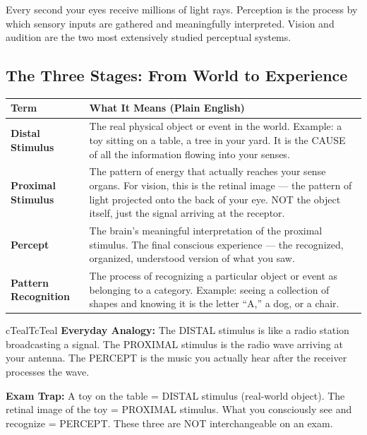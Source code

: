 \documentclass[11pt,a4paper]{article}
\newcommand{\bb}[1]{\textbf{#1}}
\begin{document}
Every second your eyes receive millions of light rays. Perception is the process by which sensory inputs are gathered and meaningfully interpreted. Vision and audition are the two most extensively studied perceptual systems.

\subsection*{The Three Stages: From World to Experience}

\begin{center}
\renewcommand{\arraystretch}{1.4}
\begin{tabular}{|L{3.2cm}|L{12cm}|}
\hline
{}\color{white}\bb{Term} & \color{white}\bb{What It Means (Plain English)} \\
\hline
\bb{Distal Stimulus} & The real physical object or event in the world. Example: a toy sitting on a table, a tree in your yard. It is the CAUSE of all the information flowing into your senses. \\
\bb{Proximal Stimulus} & The pattern of energy that actually reaches your sense organs. For vision, this is the retinal image --- the pattern of light projected onto the back of your eye. NOT the object itself, just the signal arriving at the receptor. \\
\bb{Percept} & The brain's meaningful interpretation of the proximal stimulus. The final conscious experience --- the recognized, organized, understood version of what you saw. \\
\bb{Pattern Recognition} & The process of recognizing a particular object or event as belonging to a category. Example: seeing a collection of shapes and knowing it is the letter ``A,'' a dog, or a chair. \\
\hline
\end{tabular}
\end{center}

\begin{hintbox}{cTealT}{cTeal}
\bb{Everyday Analogy:} The DISTAL stimulus is like a radio station broadcasting a signal. The PROXIMAL stimulus is the radio wave arriving at your antenna. The PERCEPT is the music you actually hear after the receiver processes the wave.
\end{hintbox}

\begin{warnbox}
\bb{Exam Trap:} A toy on the table = DISTAL stimulus (real-world object). The retinal image of the toy = PROXIMAL stimulus. What you consciously see and recognize = PERCEPT. These three are NOT interchangeable on an exam.
\end{warnbox}
\end{document}

